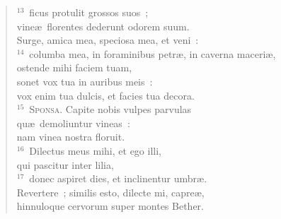 \begin{verse}
${}^{13}$~ficus protulit grossos suos~;\\ vine\ae\ florentes dederunt odorem suum.\\ Surge, amica mea, speciosa mea, et veni~:\\
${}^{14}$~columba mea, in foraminibus petr\ae , in caverna maceri\ae ,\\ ostende mihi faciem tuam,\\ sonet vox tua in auribus meis~:\\ vox enim tua dulcis, et facies tua decora.\\
${}^{15}$~\textsc{Sponsa.} Capite nobis vulpes parvulas\\ qu\ae\ demoliuntur vineas~:\\ nam vinea nostra floruit.\\
${}^{16}$~Dilectus meus mihi, et ego illi,\\ qui pascitur inter lilia,\\
${}^{17}$~donec aspiret dies, et inclinentur umbr\ae .\\ Revertere~; similis esto, dilecte mi, capre\ae ,\\ hinnuloque cervorum super montes Bether.\end{verse}



